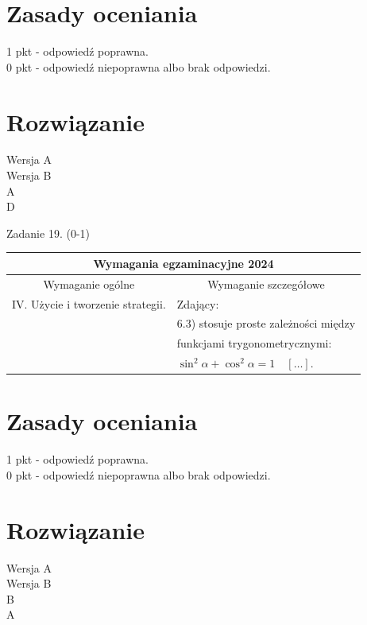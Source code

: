 \documentclass[10pt]{article}
\begin{document}
\section*{Zasady oceniania}
1 pkt - odpowiedź poprawna.\\
0 pkt - odpowiedź niepoprawna albo brak odpowiedzi.

\section*{Rozwiązanie}
Wersja A\\
Wersja B\\
A\\
D

Zadanie 19. (0-1)

\begin{center}
\begin{tabular}{|l|l|}
\hline
\multicolumn{2}{|c|}{Wymagania egzaminacyjne 2024} \\
\hline
\multicolumn{1}{|c|}{Wymaganie ogólne} & \multicolumn{1}{|c|}{Wymaganie szczegółowe} \\
\hline
IV. Użycie i tworzenie strategii. & Zdający: \\
 & 6.3) stosuje proste zależności między \\
 & funkcjami trygonometrycznymi: \\
 & $\sin ^{2} \alpha+\cos ^{2} \alpha=1 \quad[\ldots]$. \\
\hline
\end{tabular}
\end{center}

\section*{Zasady oceniania}
1 pkt - odpowiedź poprawna.\\
0 pkt - odpowiedź niepoprawna albo brak odpowiedzi.

\section*{Rozwiązanie}
Wersja A\\
Wersja B\\
B\\
A
\end{document}
